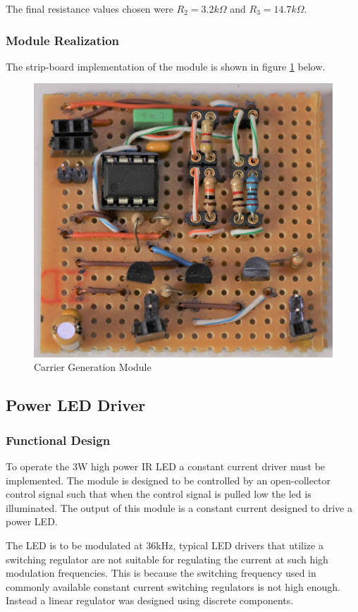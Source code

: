 The final resistance values chosen were $R_2 = 3.2k\Omega$ and $R_3 = 14.7k\Omega$.

\subsubsection{Module Realization}
The strip-board implementation of the module is shown in figure \ref{fig:module_carrier_generation} below.

\begin{figure}[H]
	\centering
	\includegraphics[width=.6\textwidth]{figures/modules/carrier_generator.jpg}
	\caption{Carrier Generation Module}
	\label{fig:module_carrier_generation}
\end{figure}






\subsection{Power LED Driver}

\subsubsection{Functional Design}
To operate the 3W high power IR LED a constant current driver must be implemented. The module is designed to be controlled by an open-collector control signal such that when the control signal is pulled low the led is illuminated. The output of this module is a constant current designed to drive a power LED.

The LED is to be modulated at 36kHz, typical LED drivers that utilize a switching regulator are not suitable for regulating the current at such high modulation frequencies. This is because the switching frequency used in commonly available constant current switching regulators is not high enough. Instead a linear regulator was designed using discrete components.

